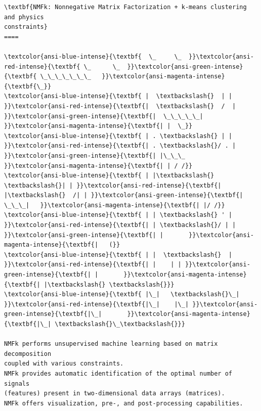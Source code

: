 \documentclass[11pt]{article}
\begin{document}
    \begin{Verbatim}[commandchars=\\\{\}]
\textbf{NMFk: Nonnegative Matrix Factorization + k-means clustering and physics
constraints}
====

\textcolor{ansi-blue-intense}{\textbf{  \_     \_  }}\textcolor{ansi-red-intense}{\textbf{ \_      \_  }}\textcolor{ansi-green-intense}{\textbf{ \_\_\_\_\_\_\_   }}\textcolor{ansi-magenta-intense}{\textbf{\_}}
\textcolor{ansi-blue-intense}{\textbf{ |  \textbackslash{}  | | }}\textcolor{ansi-red-intense}{\textbf{|  \textbackslash{}  /  | }}\textcolor{ansi-green-intense}{\textbf{|  \_\_\_\_\_| }}\textcolor{ansi-magenta-intense}{\textbf{| |  \_}}
\textcolor{ansi-blue-intense}{\textbf{ | . \textbackslash{} | | }}\textcolor{ansi-red-intense}{\textbf{| . \textbackslash{}/ . | }}\textcolor{ansi-green-intense}{\textbf{| |\_\_\_    }}\textcolor{ansi-magenta-intense}{\textbf{| | / /}}
\textcolor{ansi-blue-intense}{\textbf{ | |\textbackslash{} \textbackslash{}| | }}\textcolor{ansi-red-intense}{\textbf{| |\textbackslash{}  /| | }}\textcolor{ansi-green-intense}{\textbf{|  \_\_\_|   }}\textcolor{ansi-magenta-intense}{\textbf{| |/ /}}
\textcolor{ansi-blue-intense}{\textbf{ | | \textbackslash{} ' | }}\textcolor{ansi-red-intense}{\textbf{| | \textbackslash{}/ | | }}\textcolor{ansi-green-intense}{\textbf{| |       }}\textcolor{ansi-magenta-intense}{\textbf{|   (}}
\textcolor{ansi-blue-intense}{\textbf{ | |  \textbackslash{}  | }}\textcolor{ansi-red-intense}{\textbf{| |    | | }}\textcolor{ansi-green-intense}{\textbf{| |       }}\textcolor{ansi-magenta-intense}{\textbf{| |\textbackslash{} \textbackslash{}}}
\textcolor{ansi-blue-intense}{\textbf{ |\_|   \textbackslash{}\_| }}\textcolor{ansi-red-intense}{\textbf{|\_|    |\_| }}\textcolor{ansi-green-intense}{\textbf{|\_|       }}\textcolor{ansi-magenta-intense}{\textbf{|\_| \textbackslash{}\_\textbackslash{}}}

NMFk performs unsupervised machine learning based on matrix decomposition
coupled with various constraints.
NMFk provides automatic identification of the optimal number of signals
(features) present in two-dimensional data arrays (matrices).
NMFk offers visualization, pre-, and post-processing capabilities.
    \end{Verbatim}
\end{document}
